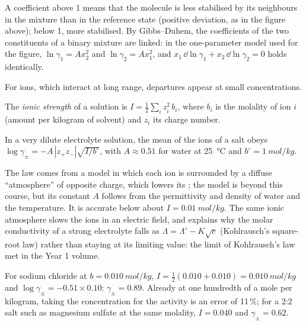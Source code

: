 A coefficient above 1 means that the molecule is less stabilised by its
neighbours in the mixture than in the reference state (positive deviation, as in the figure
above); below 1, more stabilised. By Gibbs--Duhem, the coefficients of the two
constituents of a binary mixture are linked: in the one-parameter model
used for the figure, $\ln\gamma_1 = Ax_2^2$ and $\ln\gamma_2 = Ax_1^2$, and
$x_1\,\dd\ln\gamma_1 + x_2\,\dd\ln\gamma_2 = 0$ holds identically.

For ions, which interact at long range, departures appear at small
concentrations.

\begin{definition}\label{def:b2:chemical-potential:ionic-strength}
The \emph{ionic strength} of a solution is $I =
\frac12\sum_i z_i^2\,b_i$, where $b_i$ is the molality of ion $i$ (amount per
kilogram of solvent) and $z_i$ its charge number.
\end{definition}

\begin{proposition}\label{prop:b2:chemical-potential:debye-huckel}
In a very dilute electrolyte solution, the mean  of the
ions of a salt obeys $\log\gamma_\pm = -A\,|z_+z_-|\sqrt{I/b^\circ}$, with $A
\approx 0.51$ for water at \qty{25}{\celsius} and $b^\circ =
\qty{1}{mol/kg}$.
\end{proposition}
\admitted

\begin{remark}\label{rem:b2:chemical-potential:dh-range}
The law comes from a model in which each ion is surrounded by a diffuse
``atmosphere'' of opposite charge, which lowers its ; the
model is beyond this course, but its constant $A$ follows from the
permittivity and density of water and the temperature. It is accurate below
about $I = \qty{0.01}{mol/kg}$. The same ionic atmosphere slows the ions in
an electric field, and explains why the molar conductivity of a strong
electrolyte falls as $\Lambda = \Lambda^\circ - K\sqrt c$ (Kohlrausch's
square-root law) rather than staying at its limiting value: the limit of
Kohlrausch's law met in the Year 1 volume.
\end{remark}

\begin{example}\label{ex:b2:chemical-potential:dh}
For sodium chloride at $b = \qty{0.010}{mol/kg}$, $I = \frac12(0.010 + 0.010)
= \qty{0.010}{mol/kg}$ and $\log\gamma_\pm = -0.51 \times 0.10$: $\gamma_\pm
= 0.89$. Already at one hundredth of a mole per kilogram, taking the
concentration for the activity is an error of 11\,\%; for a 2:2 salt such as
magnesium sulfate at the same molality, $I = 0.040$ and $\gamma_\pm = 0.62$.
\end{example}

